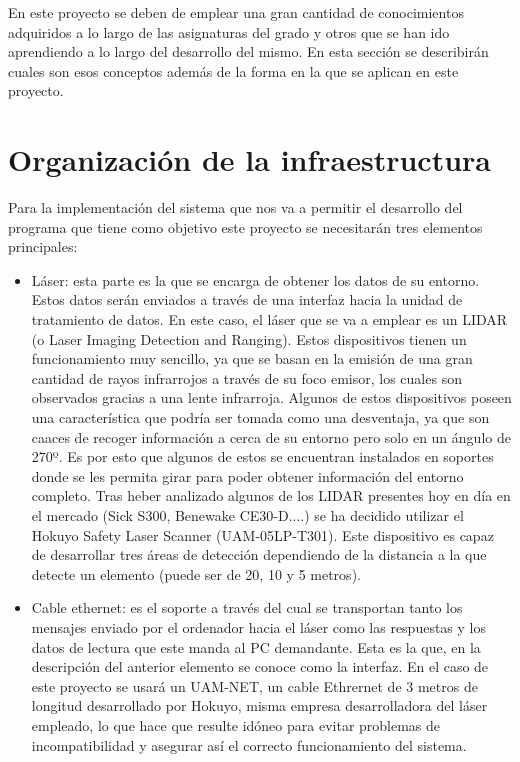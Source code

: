 \textit{}

En este proyecto se deben de emplear una gran cantidad de  conocimientos adquiridos a lo largo de las asignaturas del grado y otros que se han ido aprendiendo a lo largo del desarrollo del mismo. En esta sección se describirán cuales son esos conceptos además de la forma en la que se aplican en este proyecto.

\section{Organización de la infraestructura}

Para la implementación del sistema que nos va a permitir el desarrollo del programa que tiene como objetivo este proyecto se necesitarán tres elementos principales:
\begin{itemize}
	 \item Láser: esta parte es la que se encarga de obtener los datos de su entorno. Estos datos serán enviados a través de una interfaz hacia la unidad de tratamiento de datos.  En este caso, el láser que se va a emplear es un LIDAR (o Laser Imaging Detection and Ranging). Estos dispositivos tienen un funcionamiento muy sencillo, ya que se basan en la emisión de una gran cantidad de rayos infrarrojos a través de su foco emisor, los cuales son observados gracias a una lente infrarroja. Algunos de estos dispositivos poseen una característica que podría ser tomada como una desventaja, ya que son caaces de recoger información a cerca de su entorno pero solo en un ángulo de 270º. Es por esto que algunos de estos se encuentran instalados en soportes donde se les permita girar para poder obtener información del entorno completo. Tras heber analizado algunos de los LIDAR presentes hoy en día en el mercado (Sick S300, Benewake CE30-D....) se ha decidido utilizar el Hokuyo Safety Laser Scanner (UAM-05LP-T301). Este dispositivo es capaz de desarrollar tres áreas de detección dependiendo de la distancia a la que detecte un elemento (puede ser de 20, 10 y 5 metros).\\
    \item Cable ethernet: es el soporte a través del cual se transportan tanto los mensajes enviado por el ordenador hacia el láser como las respuestas y los datos de lectura que este manda al PC demandante. Esta es la que, en la descripción del anterior elemento se conoce como la interfaz. En el caso de este proyecto se usará un UAM-NET, un cable Ethrernet de 3 metros de longitud desarrollado por Hokuyo, misma empresa desarrolladora del láser empleado, lo que hace que resulte idóneo para evitar problemas de incompatibilidad y asegurar así el correcto funcionamiento del sistema.

\end{itemize}
